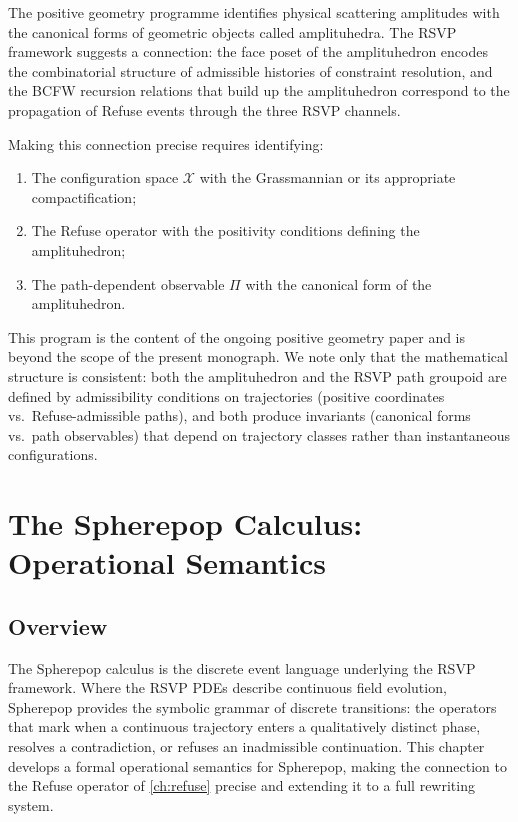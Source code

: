 \documentclass[12pt, oneside]{memoir}
\newcommand{\X}{\mathcal{X}}
\begin{document}
The positive geometry programme \cite{arkani-hamed2013} identifies physical scattering
amplitudes with the canonical forms of geometric objects called amplituhedra.  The RSVP
framework suggests a connection: the face poset of the amplituhedron encodes the
combinatorial structure of admissible histories of constraint resolution, and the BCFW
recursion relations that build up the amplituhedron correspond to the propagation of
Refuse events through the three RSVP channels.

Making this connection precise requires identifying:
\begin{enumerate}
  \item The configuration space $\X$ with the Grassmannian or its appropriate
        compactification;
  \item The Refuse operator with the positivity conditions defining the amplituhedron;
  \item The path-dependent observable $\Pi$ with the canonical form of the amplituhedron.
\end{enumerate}
This program is the content of the ongoing positive geometry paper and is beyond the
scope of the present monograph.  We note only that the mathematical structure is
consistent: both the amplituhedron and the RSVP path groupoid are defined by
admissibility conditions on trajectories (positive coordinates vs.\ Refuse-admissible
paths), and both produce invariants (canonical forms vs.\ path observables) that depend
on trajectory classes rather than instantaneous configurations.


\chapter{The Spherepop Calculus: Operational Semantics}
\label{ch:spherepop}

\section{Overview}

The Spherepop calculus is the discrete event language underlying the RSVP framework.
Where the RSVP PDEs describe continuous field evolution, Spherepop provides the
symbolic grammar of discrete transitions: the operators that mark when a continuous
trajectory enters a qualitatively distinct phase, resolves a contradiction, or refuses an
inadmissible continuation.  This chapter develops a formal operational semantics for
Spherepop, making the connection to the Refuse operator of \cref{ch:refuse} precise and
extending it to a full rewriting system.
\end{document}
